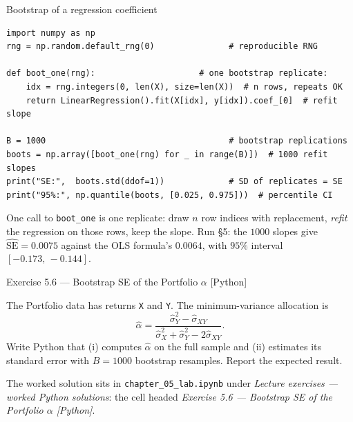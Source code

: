 \documentclass[aspectratio=169,11pt]{beamer}
\begin{document}
\begin{frame}[fragile]{Bootstrap of a regression coefficient}
  \begin{lstlisting}
import numpy as np
rng = np.random.default_rng(0)               # reproducible RNG

def boot_one(rng):                     # one bootstrap replicate:
    idx = rng.integers(0, len(X), size=len(X))  # n rows, repeats OK
    return LinearRegression().fit(X[idx], y[idx]).coef_[0]  # refit slope

B = 1000                                     # bootstrap replications
boots = np.array([boot_one(rng) for _ in range(B)])  # 1000 refit slopes
print("SE:",  boots.std(ddof=1))             # SD of replicates = SE
print("95%:", np.quantile(boots, [0.025, 0.975]))  # percentile CI
  \end{lstlisting}
  \begin{labnote}
    One call to \texttt{boot\_one} is one replicate: draw $n$ row indices with
    replacement, \emph{refit} the regression on those rows, keep the slope.
    Run \S5: the $1000$ slopes give $\widehat{\mathrm{SE}} = 0.0075$ against
    the OLS formula's $0.0064$, with $95\%$ interval $[-0.173,\,-0.144]$.
  \end{labnote}
\end{frame}

\begin{frame}[fragile]{Exercise 5.6 --- Bootstrap SE of the Portfolio $\alpha$ [Python]}
  \begin{exercise}
    The Portfolio data has returns \texttt{X} and \texttt{Y}. The
    minimum-variance allocation is
    \[
      \hat\alpha =
      \frac{\hat\sigma_Y^2 - \hat\sigma_{XY}}
           {\hat\sigma_X^2 + \hat\sigma_Y^2 - 2\hat\sigma_{XY}} .
    \]
    Write Python that (i) computes $\hat\alpha$ on the full sample and
    (ii) estimates its standard error with $B = 1000$ bootstrap
    resamples. Report the expected result.
  \end{exercise}
  \begin{labnote}
    The worked solution sits in \texttt{chapter\_05\_lab.ipynb} under
    \emph{Lecture exercises --- worked Python solutions}: the cell headed
    \emph{Exercise 5.6 --- Bootstrap SE of the Portfolio $\alpha$ [Python]}.
  \end{labnote}
\end{frame}
\end{document}
